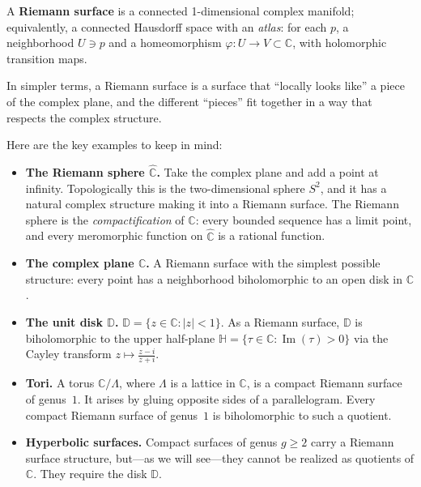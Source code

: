\begin{definition}
A \textbf{Riemann surface} is a connected 1-dimensional complex manifold; equivalently, a connected Hausdorff space with an \emph{atlas}: for each $p$, a neighborhood $U\ni p$ and a homeomorphism $\varphi:U\to V\subset\mathbb{C}$, with holomorphic transition maps.
\end{definition}

In simpler terms, a Riemann surface is a surface that ``locally looks like'' a piece of the complex plane, and the different ``pieces'' fit together in a way that respects the complex structure.

Here are the key examples to keep in mind:

\begin{itemize}
    \item \textbf{The Riemann sphere $\widehat{\mathbb{C}}$.} Take the complex plane and add a point at infinity. Topologically this is the two-dimensional sphere $S^2$, and it has a natural complex structure making it into a Riemann surface. The Riemann sphere is the \emph{compactification} of $\mathbb{C}$: every bounded sequence has a limit point, and every meromorphic function on $\widehat{\mathbb{C}}$ is a rational function.

    \item \textbf{The complex plane $\mathbb{C}$.} A Riemann surface with the simplest possible structure: every point has a neighborhood biholomorphic to an open disk in $\mathbb{C}$.

    \item \textbf{The unit disk $\mathbb{D}$.} $\mathbb{D} = \{z \in \mathbb{C} : |z| < 1\}$. As a Riemann surface, $\mathbb{D}$ is biholomorphic to the upper half-plane $\mathbb{H} = \{\tau \in \mathbb{C} : \operatorname{Im}(\tau) > 0\}$ via the Cayley transform $z \mapsto \frac{z-i}{z+i}$.

    \item \textbf{Tori.} A torus $\mathbb{C}/\Lambda$, where $\Lambda$ is a lattice in $\mathbb{C}$, is a compact Riemann surface of genus~$1$. It arises by gluing opposite sides of a parallelogram. Every compact Riemann surface of genus~$1$ is biholomorphic to such a quotient.

    \item \textbf{Hyperbolic surfaces.} Compact surfaces of genus $g \geq 2$ carry a Riemann surface structure, but---as we will see---they cannot be realized as quotients of $\mathbb{C}$. They require the disk $\mathbb{D}$.
\end{itemize}

